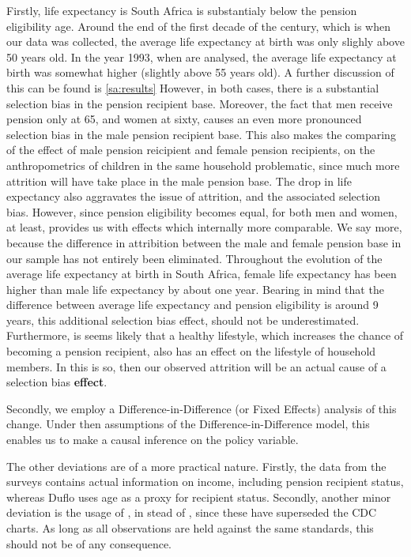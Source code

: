 \begin{refsection}
Firstly, life expectancy is South Africa is substantialy below the pension eligibility age.
Around the end of the first decade of the century, which is when our data was collected,
the average life expectancy at birth was only slighly above 50 years old.
In the year 1993, when \textcite{duflo2000child,duflo2003grandmothers} are analysed,
the average life expectancy at birth was somewhat higher (slightly above 55 years old).
A further discussion of this can be found is \autoref{sa:results}
However, in both cases, there is a substantial selection bias in the pension recipient base.
Moreover, the fact that men receive pension only at 65, and women at sixty,
causes an even more pronounced selection bias in the male pension recipient base.
This also makes the comparing of the effect of male pension reicipient and female pension recipients,
on the anthropometrics of children in the same household problematic,
since much more attrition will have take place in the male pension base.
The drop in life expectancy also aggravates the issue of attrition,
and the associated selection bias.
However, since pension eligibility becomes equal, for both men and women, at least,
provides us with effects which internally more comparable.
We say more, because the difference in attribition between the male and female pension base in our sample has not entirely been eliminated.
Throughout the evolution of the average life expectancy at birth in South Africa,
female life expectancy has been higher than male life expectancy by about one year.
Bearing in mind that the difference between average life expectancy and pension eligibility is around 9 years,
this additional selection bias effect, should not be underestimated.
Furthermore, is seems likely that a healthy lifestyle, which increases the chance of becoming a pension recipient,
also has an effect on the lifestyle of household members.
In this is so, then our observed attrition will be an actual cause of a selection bias \textbf{effect}.


Secondly, we employ a Difference-in-Difference (or Fixed Effects) analysis of this change.
Under then assumptions of the Difference-in-Difference model,
this enables us to make a causal inference on the policy variable.

The other deviations are of a more practical nature.
Firstly, the data from the \textcite{saldru2008nids,saldru2012nids,saldru2013} surveys contains actual information on income,
including pension recipient status, whereas Duflo uses age as a proxy for recipient status.
Secondly, another minor deviation is the usage of \textcite[WHO Child Growth Standards]{who2006child},
in stead of \textcite[CDC Growth Charts: United States]{nchs2000cdc}, since these have superseded the CDC charts.
As long as all observations are held against the same standards, this should not be of any consequence.


\end{refsection}
